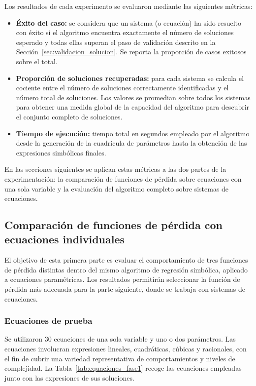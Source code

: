 \documentclass{article} \usepackage[utf8]{inputenc} \usepackage[spanish]{babel} \usepackage{amsmath, amssymb, amsthm} \usepackage{bm} \usepackage{float} \usepackage{longtable} \usepackage[hidelinks]{hyperref} \spanishdecimal{.}
\begin{document}
Los resultados de cada experimento se evaluaron mediante las siguientes métricas:

\begin{itemize} \item \textbf{Éxito del caso:} se considera que un sistema (o ecuación) ha sido resuelto con éxito si el algoritmo encuentra exactamente el número de soluciones esperado y todas ellas superan el paso de validación descrito en la Sección~\ref{sec:validacion_solucion}. Se reporta la proporción de casos exitosos sobre el total.

\item \textbf{Proporción de soluciones recuperadas:} para cada sistema se calcula el cociente entre el número de soluciones correctamente identificadas y el número total de soluciones. Los valores se promedian sobre todos los sistemas para obtener una medida global de la capacidad del algoritmo para descubrir el conjunto completo de soluciones.

\item \textbf{Tiempo de ejecución:} tiempo total en segundos empleado por el algoritmo desde la generación de la cuadrícula de parámetros hasta la obtención de las expresiones simbólicas finales. \end{itemize}

En las secciones siguientes se aplican estas métricas a las dos partes de la experimentación: la comparación de funciones de pérdida sobre ecuaciones con una sola variable y la evaluación del algoritmo completo sobre sistemas de ecuaciones.

\subsection{Comparación de funciones de pérdida con ecuaciones individuales} \label{sec:fase1}

El objetivo de esta primera parte es evaluar el comportamiento de tres funciones de pérdida distintas dentro del mismo algoritmo de regresión simbólica, aplicado a ecuaciones paramétricas. Los resultados permitirán seleccionar la función de pérdida más adecuada para la parte siguiente, donde se trabaja con sistemas de ecuaciones.

\subsubsection{Ecuaciones de prueba}

Se utilizaron 30 ecuaciones de una sola variable y uno o dos parámetros. Las ecuaciones involucran expresiones lineales, cuadráticas, cúbicas y racionales, con el fin de cubrir una variedad representativa de comportamientos y niveles de complejidad. La Tabla~\ref{tab:equaciones_fase1} recoge las ecuaciones empleadas junto con las expresiones de sus soluciones.
\end{document}
